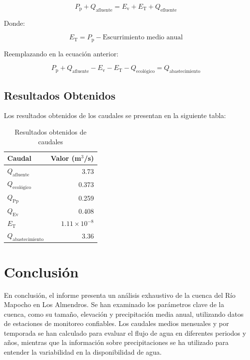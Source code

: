 \documentclass{article} %
\begin{document}
\begin{equation}
    P_{\text{p}} + Q_{\text{afluente}} = E_{\text{v}} + E_{\text{T}} + Q_{\text{efluente}}
\end{equation}

Donde:

\begin{equation}
    E_{\text{T}} = P_{\text{p}} - \text{Escurrimiento medio anual}
\end{equation}

Reemplazando en la ecuación anterior:

\begin{equation}
    P_{\text{p}} + Q_{\text{afluente}} - E_{\text{v}} - E_{\text{T}} - Q_{\text{ecológico}} = Q_{\text{abastecimiento}}
\end{equation}

\newpage
\subsection{Resultados Obtenidos}

Los resultados obtenidos de los caudales se presentan en la siguiente tabla:

\begin{table}[h]
    \centering
    \caption{Resultados obtenidos de caudales}
    \begin{tabular}{lr}
        \toprule
        \textbf{Caudal} & \textbf{Valor (m\(^3\)/s)} \\
        \midrule
        \(Q_{\text{afluente}}\) & 3.73 \\
        \(Q_{\text{ecológico}}\) & 0.373 \\
        \(Q_{\text{Pp}}\) & 0.259 \\
        \(Q_{\text{Ev}}\) & 0.408 \\
        \(E_{\text{T}}\) & \(1.11 \times 10^{-8}\) \\
        \(Q_{\text{abastecimiento}}\) & 3.36 \\
        \bottomrule
    \end{tabular}
\end{table}

\newpage
\section{Conclusión}
En conclusión, el informe presenta un análisis exhaustivo de la cuenca del Río Mapocho en Los Almendros. Se han examinado los parámetros clave de la cuenca, como su tamaño, elevación y precipitación media anual, utilizando datos de estaciones de monitoreo confiables. Los caudales medios mensuales y por temporada se han calculado para evaluar el flujo de agua en diferentes periodos y años, mientras que la información sobre precipitaciones se ha utilizado para entender la variabilidad en la disponibilidad de agua.
\end{document}
